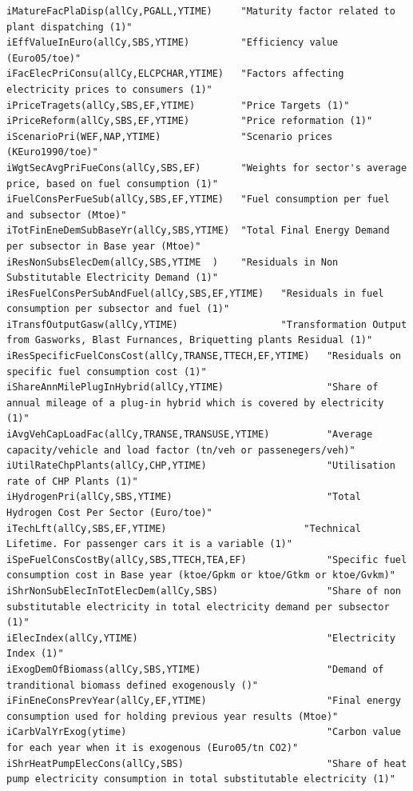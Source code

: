 \documentclass[a4paper,]{scrartcl}
\begin{document}
\begin{lstlisting}
iMatureFacPlaDisp(allCy,PGALL,YTIME)     "Maturity factor related to plant dispatching (1)"     
iEffValueInEuro(allCy,SBS,YTIME)         "Efficiency value (Euro05/toe)"
iFacElecPriConsu(allCy,ELCPCHAR,YTIME)   "Factors affecting electricity prices to consumers (1)"
iPriceTragets(allCy,SBS,EF,YTIME)        "Price Targets (1)"
iPriceReform(allCy,SBS,EF,YTIME)         "Price reformation (1)"
iScenarioPri(WEF,NAP,YTIME)              "Scenario prices (KEuro1990/toe)"  
iWgtSecAvgPriFueCons(allCy,SBS,EF)       "Weights for sector's average price, based on fuel consumption (1)"    
iFuelConsPerFueSub(allCy,SBS,EF,YTIME)   "Fuel consumption per fuel and subsector (Mtoe)"
iTotFinEneDemSubBaseYr(allCy,SBS,YTIME)  "Total Final Energy Demand per subsector in Base year (Mtoe)"
iResNonSubsElecDem(allCy,SBS,YTIME  )    "Residuals in Non Substitutable Electricity Demand (1)"    
iResFuelConsPerSubAndFuel(allCy,SBS,EF,YTIME)   "Residuals in fuel consumption per subsector and fuel (1)"  
iTransfOutputGasw(allCy,YTIME)                  "Transformation Output from Gasworks, Blast Furnances, Briquetting plants Residual (1)" 
iResSpecificFuelConsCost(allCy,TRANSE,TTECH,EF,YTIME)   "Residuals on specific fuel consumption cost (1)"
iShareAnnMilePlugInHybrid(allCy,YTIME)                  "Share of annual mileage of a plug-in hybrid which is covered by electricity (1)"
iAvgVehCapLoadFac(allCy,TRANSE,TRANSUSE,YTIME)          "Average capacity/vehicle and load factor (tn/veh or passenegers/veh)" 
iUtilRateChpPlants(allCy,CHP,YTIME)                     "Utilisation rate of CHP Plants (1)"    
iHydrogenPri(allCy,SBS,YTIME)                           "Total Hydrogen Cost Per Sector (Euro/toe)"
iTechLft(allCy,SBS,EF,YTIME)                        "Technical Lifetime. For passenger cars it is a variable (1)"
iSpeFuelConsCostBy(allCy,SBS,TTECH,TEA,EF)              "Specific fuel consumption cost in Base year (ktoe/Gpkm or ktoe/Gtkm or ktoe/Gvkm)" 
iShrNonSubElecInTotElecDem(allCy,SBS)                   "Share of non substitutable electricity in total electricity demand per subsector (1)"
iElecIndex(allCy,YTIME)                                 "Electricity Index (1)" 
iExogDemOfBiomass(allCy,SBS,YTIME)                      "Demand of tranditional biomass defined exogenously ()" 
iFinEneConsPrevYear(allCy,EF,YTIME)                     "Final energy consumption used for holding previous year results (Mtoe)"    
iCarbValYrExog(ytime)                                   "Carbon value for each year when it is exogenous (Euro05/tn CO2)"
iShrHeatPumpElecCons(allCy,SBS)                         "Share of heat pump electricity consumption in total substitutable electricity (1)"                                 

\end{lstlisting}
\end{document}
